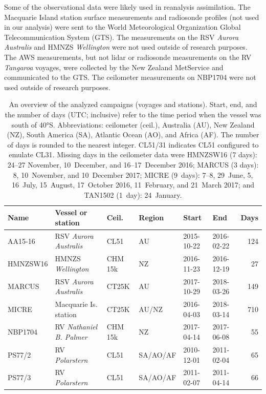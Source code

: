 \documentclass[draft]{agujournal2019}
\begin{document}
Some of the observational data were likely used in reanalysis assimilation. The Macquarie Island station surface measurements and radiosonde profiles (not used in our analysis) were sent to the World Meteorological Organization Global Telecommunication System (GTS). The measurements on the RSV \textit{Aurora Australis} and HMNZS \textit{Wellington} were not used outside of research purposes. The AWS measurements, but not lidar or radiosonde measurements on the RV \textit{Tangaroa} voyages, were collected by the New Zealand MetService and communicated to the GTS. The ceilometer measurements on NBP1704 were not used outside of research purposes.

\begin{table}[p!]
\caption{
An overview of the analyzed campaigns (voyages and stations). Start, end, and the number of days (UTC; inclusive) refer to the time period when the vessel was south of 40°S. Abbreviations: ceilometer (ceil.), Australia (AU), New Zealand (NZ), South America (SA), Atlantic Ocean (AO), and Africa (AF). The number of days is rounded to the nearest integer. CL51/31 indicates CL51 configured to emulate CL31. Missing days in the ceilometer data were HMNZSW16 (7 days): 24--27 November, 10~December, and 16--17~December 2016; MARCUS (3 days): 8, 10~November, and 10~December 2017; MICRE (9~days): 7--8, 29~June, 5, 16~July, 15~August, 17~October 2016, 11~February, and 21~March 2017; and TAN1502 (1~day): 24~January.
}
\label{tab:voyages}
\centering
\small
\begin{tabular}{llllllr}
\textbf{Name} & \textbf{Vessel or station} & \textbf{Ceil.} & \textbf{Region} & \textbf{Start} & \textbf{End} & \textbf{Days}\\
\hline
AA15-16  & RSV \emph{Aurora Australis}   & CL51    & AU       & 2015-10-22 & 2016-02-22 & 124 \\
HMNZSW16 & HMNZS \emph{Wellington}       & CHM 15k & NZ       & 2016-11-23 & 2016-12-19 & 27 \\
MARCUS   & RSV \emph{Aurora Australis}   & CT25K   & AU       & 2017-10-29 & 2018-03-26 & 149 \\
MICRE    & Macquarie Is. station         & CT25K   & AU/NZ    & 2016-04-03 & 2018-03-14 & 710 \\
NBP1704  & RV \emph{Nathaniel B. Palmer} & CHM 15k & NZ       & 2017-04-14 & 2017-06-08 & 55 \\
PS77/2   & RV \emph{Polarstern}          & CL51    & SA/AO/AF & 2010-12-01 & 2011-02-04 & 65 \\
PS77/3   & RV \emph{Polarstern}          & CL51    & SA/AO/AF & 2011-02-07 & 2011-04-14 & 66 \\

\end{tabular}
\end{table}
\end{document}
